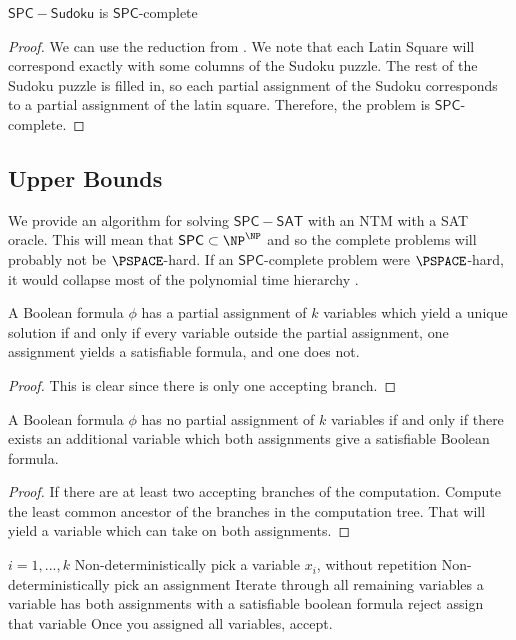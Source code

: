 \documentclass[runningheads,a4paper]{llncs}
\begin{document}
\begin{corollary}
$\mathsf{SPC-Sudoku}$ is $\mathsf{SPC}$-complete
\end{corollary}

\begin{proof}
We can use the reduction from \cite{takayuki2003complexity}. We note that each Latin Square will correspond exactly with some columns of the Sudoku puzzle. The rest of the Sudoku puzzle is filled in, so each partial assignment of the Sudoku corresponds to a partial assignment of the latin square. Therefore, the problem is $\mathsf{SPC}$-complete.
\end{proof}

\subsection{Upper Bounds}

We provide an algorithm for solving $\mathsf{SPC-SAT}$ with an NTM with a SAT oracle. This will mean that $\mathsf{SPC} \subset \NP^{\NP}$ and so the complete problems will probably not be $\PSPACE$-hard. If an $\mathsf{SPC}$-complete problem were $\PSPACE$-hard, it would collapse most of the polynomial time hierarchy \cite{stockmeyer1976polynomial}. 

\begin{lemma}
A Boolean formula $\phi$ has a partial assignment of $k$ variables which yield a unique solution if and only if every variable outside the partial assignment, one assignment yields a satisfiable formula, and one does not.
\end{lemma}

\begin{proof}
This is clear since there is only one accepting branch.
\end{proof}

\begin{lemma}
A Boolean formula $\phi$ has no partial assignment of $k$ variables if and only if there exists an additional variable which both assignments give a satisfiable Boolean formula.
\end{lemma}

\begin{proof}
If there are at least two accepting branches of the computation. Compute the least common ancestor of the branches in the computation tree. That will yield a variable which can take on both assignments. 
\end{proof}

\begin{codebox}
\li \For $i = 1, ..., k$ \Then
\li Non-deterministically pick a variable $x_i$, without repetition
\li Non-deterministically pick an assignment \End
\li Iterate through all remaining variables \Then
\li \If a variable has both assignments with a satisfiable boolean formula \Then
\li reject
\li \Else assign that variable \End \End
\li Once you assigned all variables, accept.
\end{codebox}
\end{document}

